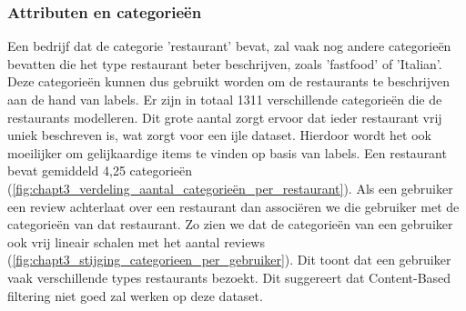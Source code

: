 \subsubsection{Attributen en categorieën}
\label{sec:chapt3_labeled_data_attributes_categories}
Een bedrijf dat de categorie 'restaurant' bevat, zal vaak nog andere categorieën bevatten die het type restaurant beter beschrijven, zoals 'fastfood' of 'Italian'. Deze categorieën kunnen dus gebruikt worden om de restaurants te beschrijven aan de hand van labels. Er zijn in totaal 1311 verschillende categorieën die de restaurants modelleren. Dit grote aantal zorgt ervoor dat ieder restaurant vrij uniek beschreven is, wat zorgt voor een ijle dataset. Hierdoor wordt het ook moeilijker om gelijkaardige items te vinden op basis van labels. Een restaurant bevat gemiddeld 4,25 categorieën (\autoref{fig:chapt3_verdeling_aantal_categorieën_per_restaurant}).\newline
Als een gebruiker een review achterlaat over een restaurant dan associëren we die gebruiker met de categorieën van dat restaurant. Zo zien we dat de categorieën van een gebruiker ook vrij lineair schalen met het aantal reviews (\autoref{fig:chapt3_stijging_categorieen_per_gebruiker}). Dit toont dat een gebruiker vaak verschillende types restaurants bezoekt. Dit suggereert dat Content-Based filtering niet goed zal werken op deze dataset.


